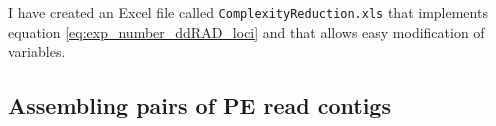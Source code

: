 \documentclass[a4paper,12pt,times,authoryear,twoside,print,index]{Classes/PhDThesisPSnPDF}\usepackage[]{graphicx}\usepackage[]{color}
\begin{document}
I have created an Excel file called \texttt{ComplexityReduction.xls} that implements equation \ref{eq:exp_number_ddRAD_loci} and that allows easy modification of variables.


\FloatBarrier
\subsection{Assembling pairs of PE read contigs}
\label{ch:read_mapping}
\end{document}

